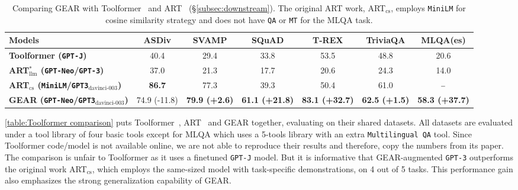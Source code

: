 \documentclass[11pt]{article}
\newcommand{\name}{{\fontfamily{cmss}\selectfont GEAR}}
\newcommand{\mt}{{\tt MT}}
\newcommand{\qa}{{\tt QA}}
\newcommand{\mlqa}{{\tt Multilingual QA}}
\newcommand{\gptj}{{\tt \textcolor{darkredTwo}{GPT-J}}}
\newcommand{\gptDavinciThree}{{\tt \textcolor{darkredTwo}{GPT3$_{\text{davinci-003}}$}}}
\newcommand{\gptNeo}{{\tt \textcolor{darkblueTwo}{GPT-Neo}}}
\newcommand{\miniLM}{{\tt \textcolor{darkblueTwo}{MiniLM}}}
\newcommand{\gptThree}{{\tt \textcolor{darkredTwo}{GPT-3}}}
\begin{document}
\begin{table}[t]
\small
\centering
\begin{tabular}{lcccccc}
\toprule
        \textbf{Models}              & \textbf{ASDiv} & \textbf{SVAMP} & \textbf{SQuAD} & \textbf{T-REX} & \textbf{TriviaQA} & \textbf{MLQA(es)} \\ \midrule   
\textbf{Toolformer (\gptj)} & 40.4           & 29.4           & 33.8           & 53.5           & 48.8              & 20.6              \\
\textbf{ART$^\ast_{\text{llm}}$ (\gptNeo/\gptThree)} & 37.0 & 21.3 & 17.7 & 20.6 & 24.3 & 14.0 \\
\textbf{ART$_{\text{cs}}$ (\miniLM/\gptDavinciThree)}      & \textbf{86.7}           & 77.3           & 39.3           & 50.4           & 61.0              &      $\rule[0.5ex]{0.5em}{0.4pt}$              \\
\textbf{\name{} (\gptNeo/\gptDavinciThree)}     & 74.9 (-11.8)           & \textbf{79.9 (+2.6)}           & \textbf{61.1 (+21.8)}           & \textbf{83.1 (+32.7)}           & \textbf{62.5 (+1.5)}              & \textbf{58.3 (+37.7)}              \\ \bottomrule
\end{tabular}
\caption{Comparing \name{} with Toolformer~\citep{schick2023toolformer} and ART~\citep{paranjape2023art} (\S\ref{subsec:downstream}). The original ART work, ART$_{\text{cs}}$, employs \miniLM{} for cosine similarity strategy and does not have \qa{} or \mt{} for the MLQA task.}
\label{table:Toolformer comparison}
\end{table}

\autoref{table:Toolformer comparison} puts Toolformer~\citep{schick2023toolformer}, ART~\citep{paranjape2023art} and \name{} together, evaluating on their shared datasets. All datasets are evaluated under a tool library of four basic tools except for MLQA which uses a 5-tools library with an extra \mlqa{} tool.
Since Toolformer code/model is not available online, we are not able to reproduce their results and therefore, copy the numbers from its paper. The comparison is unfair to Toolformer as it uses a finetuned \gptj{} model. 
But it is informative that \name{}-augmented \gptThree{} outperforms the original work ART$_{\text{cs}}$, which employs the same-sized model with task-specific demonstrations, on 4 out of 5 tasks. This performance gain also emphasizes the strong generalization capability of \name{}.
\end{document}

